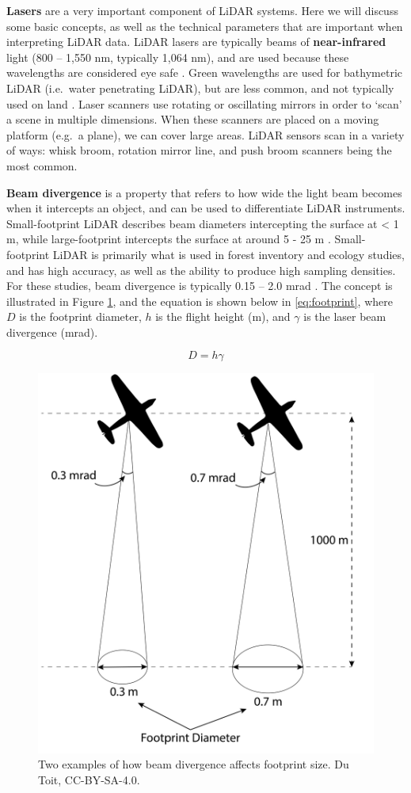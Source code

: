 \documentclass[
]{book}
\begin{document}
\textbf{Lasers} are a very important component of LiDAR systems. Here we will discuss some basic concepts, as well as the technical parameters that are important when interpreting LiDAR data. LiDAR lasers are typically beams of \textbf{near-infrared} light (800 -- 1,550 nm, typically 1,064 nm), and are used because these wavelengths are considered eye safe \citep{white_best_2013}. Green wavelengths are used for bathymetric LiDAR (i.e.~water penetrating LiDAR), but are less common, and not typically used on land \citep{uf_geomatics_-_fort_lauderdale_lidar_2016-2}. Laser scanners use rotating or oscillating mirrors in order to `scan' a scene in multiple dimensions. When these scanners are placed on a moving platform (e.g.~a plane), we can cover large areas. LiDAR sensors scan in a variety of ways: whisk broom, rotation mirror line, and push broom scanners being the most common.

\textbf{Beam divergence} is a property that refers to how wide the light beam becomes when it intercepts an object, and can be used to differentiate LiDAR instruments. Small-footprint LiDAR describes beam diameters intercepting the surface at \textless{} 1 m, while large-footprint intercepts the surface at around 5 - 25 m \citep{lim_lidar_2003}. Small-footprint LiDAR is primarily what is used in forest inventory and ecology studies, and has high accuracy, as well as the ability to produce high sampling densities. For these studies, beam divergence is typically 0.15 -- 2.0 mrad \citep{white_best_2013}. The concept is illustrated in Figure \ref{fig:15-Beam-Divergence}, and the equation is shown below in \eqref{eq:footprint}, where \(D\) is the footprint diameter, \(h\) is the flight height (m), and \(\gamma\) is the laser beam divergence (mrad).

\begin{equation} 
  D = h \gamma
  \label{eq:footprint}
\end{equation}

\begin{figure}
\includegraphics[width=0.6\linewidth]{images/15-Beam-Divergence} \caption{Two examples of how beam divergence affects footprint size. Du Toit, CC-BY-SA-4.0.}\label{fig:15-Beam-Divergence}
\end{figure}
\end{document}
